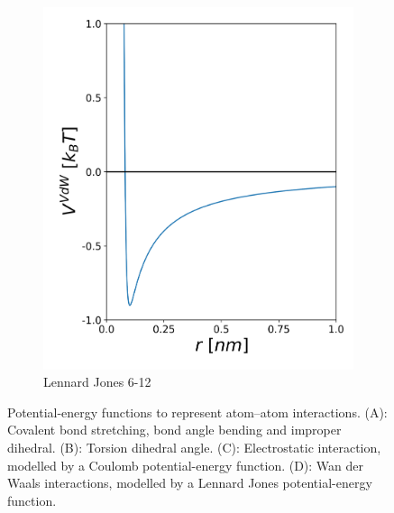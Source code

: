 \begin{figure}[h!]
\begin{subfigure}{0.45\textwidth}
        \includegraphics[width=\textwidth]{2_chapter_intro/fig/ForceField/vdwV.png}
        \caption{Lennard Jones 6-12}
	\label{sfig: lj}
    \end{subfigure}
    \caption{Potential-energy functions to represent atom--atom interactions. (A): Covalent bond stretching, bond angle bending and improper dihedral. (B): Torsion dihedral angle. (C): Electrostatic interaction, modelled by a Coulomb potential-energy function. (D): Wan der Waals interactions, modelled by a Lennard Jones potential-energy function.}
    \label{fig:FF_Functions}
\end{figure}

